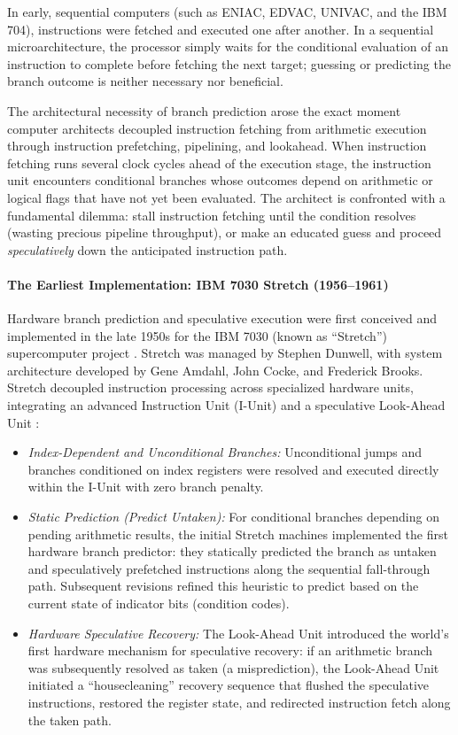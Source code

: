 In early, sequential computers (such as ENIAC, EDVAC, UNIVAC, and the IBM 704), instructions were fetched and executed one after another. In a sequential microarchitecture, the processor simply waits for the conditional evaluation of an instruction to complete before fetching the next target; guessing or predicting the branch outcome is neither necessary nor beneficial.

The architectural necessity of branch prediction arose the exact moment computer architects decoupled instruction fetching from arithmetic execution through instruction prefetching, pipelining, and lookahead. When instruction fetching runs several clock cycles ahead of the execution stage, the instruction unit encounters conditional branches whose outcomes depend on arithmetic or logical flags that have not yet been evaluated. The architect is confronted with a fundamental dilemma: stall instruction fetching until the condition resolves (wasting precious pipeline throughput), or make an educated guess and proceed \emph{speculatively} down the anticipated instruction path.

\paragraph{The Earliest Implementation: IBM 7030 Stretch (1956--1961)}
Hardware branch prediction and speculative execution were first conceived and implemented in the late 1950s for the IBM 7030 (known as ``Stretch'') supercomputer project \cite{buchholz1962}. Stretch was managed by Stephen Dunwell, with system architecture developed by Gene Amdahl, John Cocke, and Frederick Brooks. Stretch decoupled instruction processing across specialized hardware units, integrating an advanced Instruction Unit (I-Unit) and a speculative Look-Ahead Unit \cite{blosk1960, ballance1962lookahead}:
\begin{itemize}
    \item \textit{Index-Dependent and Unconditional Branches:} Unconditional jumps and branches conditioned on index registers were resolved and executed directly within the I-Unit with zero branch penalty.
    
    \item \textit{Static Prediction (Predict Untaken):} For conditional branches depending on pending arithmetic results, the initial Stretch machines implemented the first hardware branch predictor: they statically predicted the branch as untaken and speculatively prefetched instructions along the sequential fall-through path. Subsequent revisions refined this heuristic to predict based on the current state of indicator bits (condition codes).
    
    \item \textit{Hardware Speculative Recovery:} The Look-Ahead Unit introduced the world's first hardware mechanism for speculative recovery: if an arithmetic branch was subsequently resolved as taken (a misprediction), the Look-Ahead Unit initiated a ``housecleaning'' recovery sequence that flushed the speculative instructions, restored the register state, and redirected instruction fetch along the taken path.
\end{itemize}

